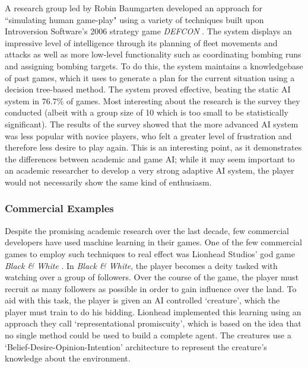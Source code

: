 \documentclass[a4paper,oneside]{report}
\begin{document}
A research group led by Robin Baumgarten developed an approach for ``simulating human game-play" using a variety of techniques built upon Introversion Software's 2006 strategy game \emph{DEFCON} \cite{Baumgarten:2008il}. The system displays an impressive level of intelligence through its planning of fleet movements and attacks as well as more low-level functionality such as coordinating bombing runs and assigning bombing targets. To do this, the system maintains a knowledgebase of past games, which it uses to generate a plan for the current situation using a decision tree-based method. The system proved effective, beating the static AI system in 76.7\% of games. Most interesting about the research is the survey they conducted (albeit with a group size of 10 which is too small to be statistically significant). The results of the survey showed that the more advanced AI system was less popular with novice players, who felt a greater level of frustration and therefore less desire to play again. This is an interesting point, as it demonstrates the differences between academic and game AI; while it may seem important to an academic researcher to develop a very strong adaptive AI system, the player would not necessarily show the same kind of enthusiasm.

\subsubsection{Commercial Examples}

Despite the promising academic research over the last decade, few commercial developers have used machine learning in their games. One of the few commercial games to employ such techniques to real effect was Lionhead Studios' god game \emph{Black \& White} \cite{:hc}. In \emph{Black \& White}, the player becomes a deity tasked with watching over a group of followers. Over the course of the game, the player must recruit as many followers as possible in order to gain influence over the land. To aid with this task, the player is given an AI controlled `creature', which the player must train to do his bidding. Lionhead implemented this learning using an approach they call `representational promiscuity', which is based on the idea that no single method could be used to build a complete agent. The creatures use a `Belief-Desire-Opinion-Intention' architecture to represent the creature's knowledge about the environment. 
\end{document}

